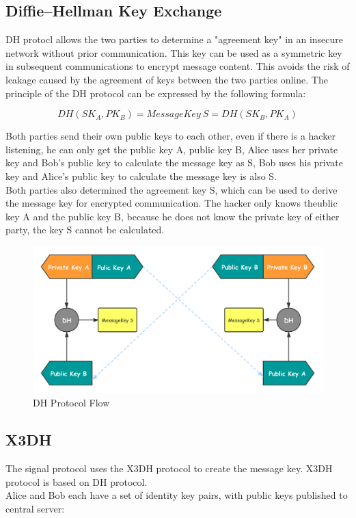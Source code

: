 \documentclass[11pt]{article}
\begin{document}
\subsection{Diffie–Hellman Key Exchange}

DH protocl allows the two parties to determine a "agreement key" in an insecure network without prior communication. This key can be used as a symmetric key in subsequent communications to encrypt message content. 
This avoids the risk of leakage caused by the agreement of keys between the two parties online. The principle of the DH protocol can be expressed by the following formula:

\begin{equation}
    DH(SK_A, PK_B) = Message Key\ S = DH(SK_B, PK_A)
\end{equation}

Both parties send their own public keys to each other, even if there is a hacker listening, he can only get the public key A, public key B, Alice uses her private key and Bob's public key to calculate the message key as S, Bob uses his private key and Alice's public key to calculate the message key is also S.\\
Both parties also determined the agreement key S, which can be used to derive the message key for encrypted communication. 
The hacker only knows theublic key A and the public key B, because he does not know the private key of either party, the key S cannot be calculated.

\begin{figure}[H]
    \centering
    \includegraphics[width=1\textwidth]{Fig1}
    \caption{DH Protocol Flow}
\end{figure}

\subsection{X3DH}
The signal protocol uses the X3DH protocol to create the message key. X3DH protocol is based on DH protocol.\\
Alice and Bob each have a set of identity key pairs, with public keys published to central server:
\end{document}
